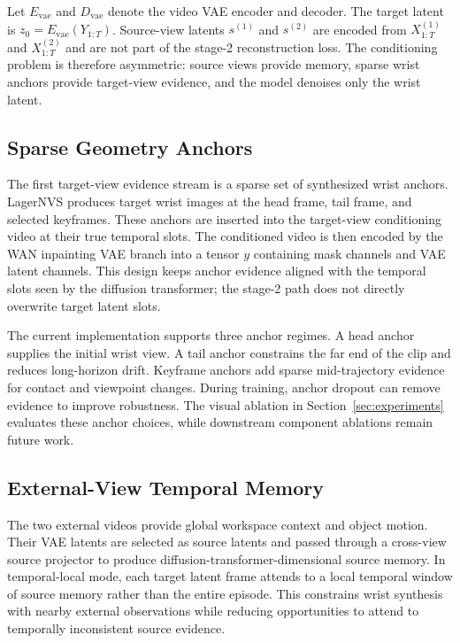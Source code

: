 \documentclass[letterpaper]{article}
\begin{document}
Let $E_{\mathrm{vae}}$ and $D_{\mathrm{vae}}$ denote the video VAE encoder and decoder.
The target latent is $z_0=E_{\mathrm{vae}}(Y_{1:T})$.
Source-view latents $s^{(1)}$ and $s^{(2)}$ are encoded from $X^{(1)}_{1:T}$ and $X^{(2)}_{1:T}$ and are not part of the stage-2 reconstruction loss.
The conditioning problem is therefore asymmetric: source views provide memory, sparse wrist anchors provide target-view evidence, and the model denoises only the wrist latent.

\subsection{Sparse Geometry Anchors}

The first target-view evidence stream is a sparse set of synthesized wrist anchors.
LagerNVS produces target wrist images at the head frame, tail frame, and selected keyframes.
These anchors are inserted into the target-view conditioning video at their true temporal slots.
The conditioned video is then encoded by the WAN inpainting VAE branch into a tensor $y$ containing mask channels and VAE latent channels.
This design keeps anchor evidence aligned with the temporal slots seen by the diffusion transformer; the stage-2 path does not directly overwrite target latent slots.

The current implementation supports three anchor regimes.
A head anchor supplies the initial wrist view.
A tail anchor constrains the far end of the clip and reduces long-horizon drift.
Keyframe anchors add sparse mid-trajectory evidence for contact and viewpoint changes.
During training, anchor dropout can remove evidence to improve robustness.
The visual ablation in Section~\ref{sec:experiments} evaluates these anchor choices, while downstream component ablations remain future work.

\subsection{External-View Temporal Memory}

The two external videos provide global workspace context and object motion.
Their VAE latents are selected as source latents and passed through a cross-view source projector to produce diffusion-transformer-dimensional source memory.
In temporal-local mode, each target latent frame attends to a local temporal window of source memory rather than the entire episode.
This constrains wrist synthesis with nearby external observations while reducing opportunities to attend to temporally inconsistent source evidence.
\end{document}

